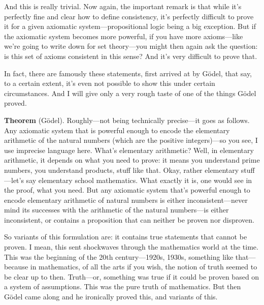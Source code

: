 And this is really trivial. Now again, the important remark is that while it's perfectly fine and clear how to define consistency, it's perfectly difficult to prove it for a given axiomatic system---propositional logic being a big exception. But if the axiomatic system becomes more powerful, if you have more axioms---like we're going to write down for set theory---you might then again ask the question: is this set of axioms consistent in this sense? And it's very difficult to prove that.

In fact, there are famously these statements, first arrived at by G\"odel, that say, to a certain extent, it's even not possible to show this under certain circumstances. And I will give only a very rough taste of one of the things G\"odel proved.

\textbf{Theorem} (G\"odel). Roughly---not being technically precise---it goes as follows. Any axiomatic system that is powerful enough to encode the elementary arithmetic of the natural numbers (which are the positive integers)---so you see, I use imprecise language here. What's elementary arithmetic? Well, in elementary arithmetic, it depends on what you need to prove: it means you understand prime numbers, you understand products, stuff like that. Okay, rather elementary stuff---let's say elementary school mathematics. What exactly it is, one would see in the proof, what you need. But any axiomatic system that's powerful enough to encode elementary arithmetic of natural numbers is either inconsistent---never mind its successes with the arithmetic of the natural numbers---is either inconsistent, or contains a proposition that can neither be proven nor disproven.

So variants of this formulation are: it contains true statements that cannot be proven. I mean, this sent shockwaves through the mathematics world at the time. This was the beginning of the 20th century---1920s, 1930s, something like that---because in mathematics, of all the arts if you wish, the notion of truth seemed to be clear up to then. Truth---or, something was true if it could be proven based on a system of assumptions. This was the pure truth of mathematics. But then G\"odel came along and he ironically proved this, and variants of this.

